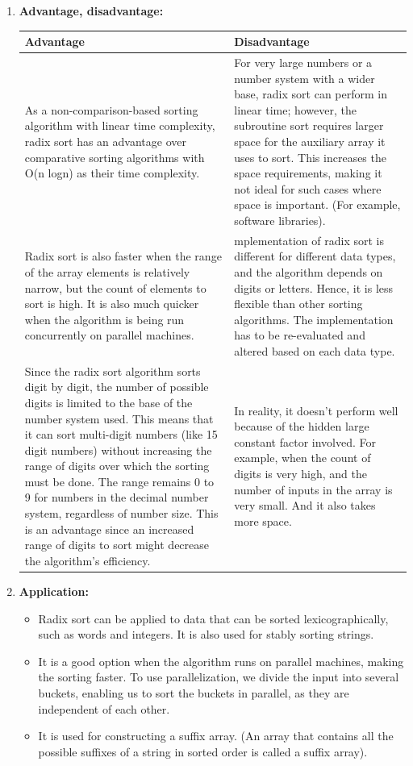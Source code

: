 \documentclass[11pt,a4paper]{article}
\begin{document}
{\begin{enumerate}[label=\textbf{\arabic*})]
				\item \textbf{Advantage, disadvantage:}
					\begin{table}[H]
						\centering
						\begin{tabular}{|p{8cm}|p{8cm}|}
							\hline
							\textbf{Advantage} & \textbf{Disadvantage} \\
							\hline
							\hline
							As a non-comparison-based sorting algorithm with linear time complexity, radix sort has an advantage over comparative sorting algorithms with O(n logn) as their time complexity.   & For very large numbers or a number system with a wider base, radix sort can perform in linear time; however, the subroutine sort requires larger space for the auxiliary array it uses to sort. This increases the space requirements, making it not ideal for such cases where space is important. (For example, software libraries). \\[12pt]
							Radix sort is also faster when the range of the array elements is relatively narrow, but the count of elements to sort is high. It is also much quicker when the algorithm is being run concurrently on parallel machines. & mplementation of radix sort is different for different data types, and the algorithm depends on digits or letters. Hence, it is less flexible than other sorting algorithms. The implementation has to be re-evaluated and altered based on each data type. \\[12pt]
							Since the radix sort algorithm sorts digit by digit, the number of possible digits is limited to the base of the number system used. This means that it can sort multi-digit numbers (like 15 digit numbers) without increasing the range of digits over which the sorting must be done. The range remains 0 to 9 for numbers in the decimal number system, regardless of number size. This is an advantage since an increased range of digits to sort might decrease the algorithm’s efficiency. & In reality, it doesn't perform well because of the hidden large constant factor involved. For example, when the count of digits is very high, and the number of inputs in the array is very small. And it also takes more space. \\
							\hline
						\end{tabular}
					\end{table}
				\item \textbf{Application:}	
					\begin{itemize}
						\item Radix sort can be applied to data that can be sorted lexicographically, such as words and integers. It is also used for stably sorting strings. 
						\item It is a good option when the algorithm runs on parallel machines, making the sorting faster. To use parallelization, we divide the input into several buckets, enabling us to sort the buckets in parallel, as they are independent of each other. 
						\item It is used for constructing a suffix array. (An array that contains all the possible suffixes of a string in sorted order is called a suffix array).
					\end{itemize}
			\end{enumerate}
			
}
\end{document}
